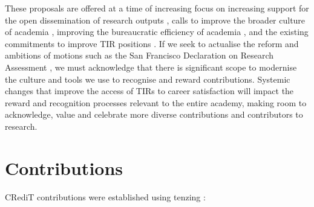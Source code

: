 \documentclass[authordate,meta,issue]{jote-new-article}
\begin{document}
These proposals are offered at a time of increasing focus on increasing support for the open dissemination of research outputs \parencites{Concordatgroup_concordat_2016}{Nelson2022}{Unesco2021}, calls to improve the broader culture of academia \parencites{Coara2022}{WellcomeTrust2020}, improving the bureaucratic efficiency of academia \parencites{IndependentReviewofResearchBureaucracy2022}, and the existing commitments to improve TIR positions \parencites{NCRIS2022}{TechnicianCommitment2020}. If we seek to actualise the reform and ambitions of motions such as the San Francisco Declaration on Research Assessment \parencites{Dora2012}, we must acknowledge that there is significant scope to modernise the culture and tools we use to recognise and reward contributions. Systemic changes that improve the access of TIRs to career satisfaction will impact the reward and recognition processes relevant to the entire academy, making room to acknowledge, value and celebrate more diverse contributions and contributors to research.





\section{Contributions}
CRediT contributions were established using tenzing \parencites{Holcombe_2020}:
\end{document}
